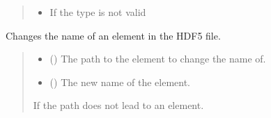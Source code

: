 \documentclass[letterpaper,10pt,english]{sphinxmanual}
\begin{document}
\begin{fulllineitems}
\begin{fulllineitems}
\begin{quote}
\begin{description}
\begin{itemize}
\item {} 
\sphinxAtStartPar
{} \textendash{} If the type is not valid

\end{itemize}

\end{description}\end{quote}

\end{fulllineitems}


\begin{fulllineitems}
\label{\detokenize{_autosummary/HDF5_BLS.wrapper:HDF5_BLS.wrapper.Wrapper.change_name}}
\pysigstartsignatures
\pysiglinewithargsret
{}
{\sphinxparamcomma {}}
{}
\pysigstopsignatures
\sphinxAtStartPar
Changes the name of an element in the HDF5 file.
\begin{quote}\begin{description}
\begin{itemize}
\item {} 
\sphinxAtStartPar
{} () \textendash{} The path to the element to change the name of.

\item {} 
\sphinxAtStartPar
{} () \textendash{} The new name of the element.

\end{itemize}

\sphinxAtStartPar
{} \textendash{} If the path does not lead to an element.

\end{description}\end{quote}

\end{fulllineitems}



\end{fulllineitems}
\end{document}

